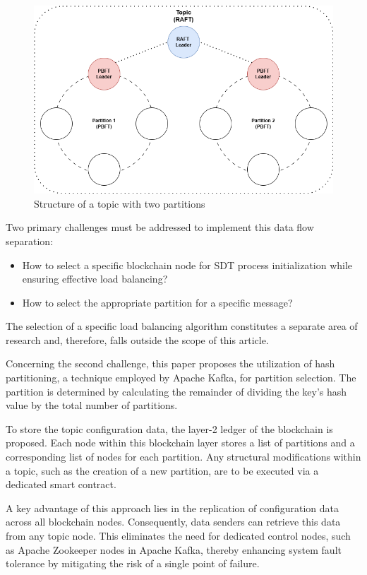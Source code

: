 \documentclass[10pt]{llncs}
\begin{document}
\begin{figure}
    \includegraphics[width=\textwidth]{two-layered-blockchain.png}
    \caption{Structure of a topic with two partitions} \label{blockchain_layers}
\end{figure}

Two primary challenges must be addressed to implement this data flow separation:

\begin{itemize}
    \item How to select a specific blockchain node for SDT process initialization while ensuring effective load balancing?
    \item How to select the appropriate partition for a specific message?
\end{itemize}

The selection of a specific load balancing algorithm constitutes a separate area of research and, therefore, falls outside the scope of this article.

Concerning the second challenge, this paper proposes the utilization of hash partitioning, a technique employed by Apache Kafka, for partition selection.  
The partition is determined by calculating the remainder of dividing the key's hash value by the total number of partitions.

To store the topic configuration data, the layer-2 ledger of the blockchain is proposed. 
Each node within this blockchain layer stores a list of partitions and a corresponding list of nodes for each partition. 
Any structural modifications within a topic, such as the creation of a new partition, are to be executed via a dedicated smart contract.

A key advantage of this approach lies in the replication of configuration data across all blockchain nodes. 
Consequently, data senders can retrieve this data from any topic node. 
This eliminates the need for dedicated control nodes, such as Apache Zookeeper nodes in Apache Kafka, thereby enhancing system fault tolerance by mitigating the risk of a single point of failure.
\end{document}
